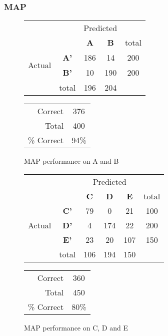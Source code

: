 \subsubsection{MAP}
\begin{figure}[!ht]
\begin{minipage}[b]{0.5\linewidth}
\centering
	\begin{tabular}{ccc|c|c}
	 & &\multicolumn{2}{c}{Predicted} &\\
	  & & \bf{A} &  \bf{B} & total \\
	 \cline{3-5}
	 \multirow{2}{*}{\begin{sideways}Actual\end{sideways}} & \bf{A'}& 186 & 14 & 200 \\
	 \cline{3-5}
	 & \bf{B'}& 10 & 190 & 200 \\
	  \cline{3-5}
	 &total&196&204&\\
	\end{tabular}
\end{minipage}
\hspace{0.5cm}
\begin{minipage}[b]{0.5\linewidth}
	\begin{tabular}{r|c}
	\hline
	Correct& 376\\
	Total& 400\\
	\hline
	\% Correct& 94\%\\
	\hline
	\end{tabular}
\end{minipage}
\vspace{1mm}
\caption{MAP performance on A and B}
\end{figure}


\begin{figure}[!ht]
\begin{minipage}[b]{0.5\linewidth}
\centering
	\begin{tabular}{ccc|c|c|c}
	 & &\multicolumn{3}{c}{Predicted} &\\
	  & & \bf{C} &  \bf{D} & \bf{E} & total \\
	 \cline{3-5}
	 \multirow{3}{*}{\begin{sideways}Actual\end{sideways}} & \bf{C'}& 79 & 0 & 21 & 100\\
	 \cline{3-6}
	 & \bf{D'}& 4 & 174 & 22 & 200\\
	  \cline{3-6}
	 & \bf{E'}& 23 & 20 & 107 &  150\\
	  \cline{3-6}
	 &total&106&194&150\\
	\end{tabular}
\end{minipage}
\hspace{0.5cm}
\begin{minipage}[b]{0.5\linewidth}
	\begin{tabular}{r|c}
	\hline
	Correct& 360\\
	Total& 450\\
	\hline
	\% Correct& 80\%\\
	\hline
	\end{tabular}
\end{minipage}
\vspace{1mm}
\caption{MAP performance on C, D and E}
\end{figure}


